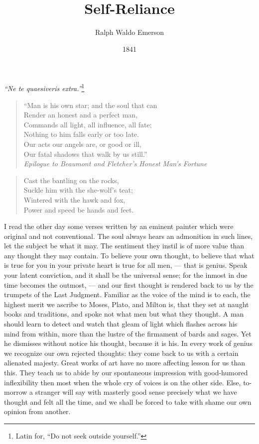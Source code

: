 \documentclass{article}
\title{Self-Reliance}
\author{Ralph Waldo Emerson}
\date{1841}
\begin{document}
\pagestyle{fancy}
\maketitle

{\it ``Ne te quaesiveris extra.''}\footnote{Latin for, ``Do not seek outside yourself.''}

\begin{verse}
``Man is his own star; and the soul that can\\
Render an honest and a perfect man,\\
Commands all light, all influence, all fate;\\
Nothing to him falls early or too late.\\
Our acts our angels are, or good or ill,\\
Our fatal shadows that walk by us still.''\\

{\it Epilogue to Beaumont and Fletcher's Honest Man's Fortune}
\end{verse}

\begin{verse}
Cast the bantling on the rocks,\\
Suckle him with the she-wolf's teat;\\
Wintered with the hawk and fox,\\
Power and speed be hands and feet.
\end{verse}

I read the other day some verses written by an eminent painter which were
original and not conventional. The soul always hears an admonition in such
lines, let the subject be what it may. The sentiment they instil is of more
value than any thought they may contain. To believe your own thought, to
believe that what is true for you in your private heart is true for all
men, --- that is genius. Speak your latent conviction, and it shall be the
universal sense; for the inmost in due time becomes the outmost, --- and our
first thought is rendered back to us by the trumpets of the Last Judgment.
Familiar as the voice of the mind is to each, the highest merit we ascribe
to Moses, Plato, and Milton is, that they set at naught books and
traditions, and spoke not what men but what they thought. A man should learn
to detect and watch that gleam of light which flashes across his mind from
within, more than the lustre of the firmament of bards and sages. Yet he
dismisses without notice his thought, because it is his. In every work of
genius we recognize our own rejected thoughts: they come back to us with a
certain alienated majesty. Great works of art have no more affecting lesson
for us than this. They teach us to abide by our spontaneous impression with
good-humored inflexibility then most when the whole cry of voices is on the
other side. Else, to-morrow a stranger will say with masterly good sense
precisely what we have thought and felt all the time, and we shall be forced
to take with shame our own opinion from another.
\end{document}
